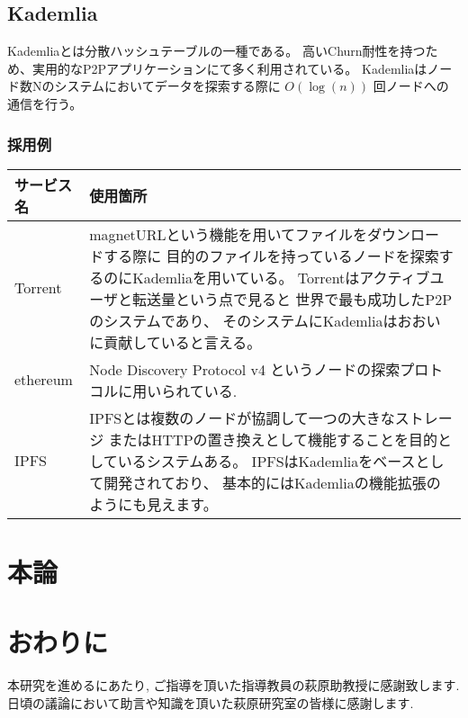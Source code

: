 \documentclass[sotsuron]{jcsie}
\begin{document}
\section{Kademlia}
Kademliaとは分散ハッシュテーブルの一種である。
高いChurn耐性を持つため、実用的なP2Pアプリケーションにて多く利用されている。
Kademliaはノード数Nのシステムにおいてデータを探索する際に
$O(\log(n))$ 回ノードへの通信を行う。
\subsection{採用例}
\begin{table}[htb]
\begin{tabular}{|l|l|}
\hline
サービス名 & 使用箇所\\ 
\hline
Torrent  &
  magnetURLという機能を用いてファイルをダウンロードする際に
  目的のファイルを持っているノードを探索するのにKademliaを用いている。
  Torrentはアクティブユーザと転送量という点で見ると
  世界で最も成功したP2Pのシステムであり、
  そのシステムにKademliaはおおいに貢献していると言える。\\ 
\hline
  ethereum & 
  Node Discovery Protocol v4 というノードの探索プロトコルに用いられている.\\ 
\hline
  IPFS     &
  IPFSとは複数のノードが協調して一つの大きなストレージ
  またはHTTPの置き換えとして機能することを目的としているシステムある。
  IPFSはKademliaをベースとして開発されており、
  基本的にはKademliaの機能拡張のようにも見えます。\\ 
\hline
\end{tabular}
\end{table}

\chapter{本論}
\chapter{おわりに}
\begin{acknowledgment}
本研究を進めるにあたり, ご指導を頂いた指導教員の萩原助教授に感謝致します.
日頃の議論において助言や知識を頂いた萩原研究室の皆様に感謝します.
\end{acknowledgment}
\nocite{*}


\end{document}
